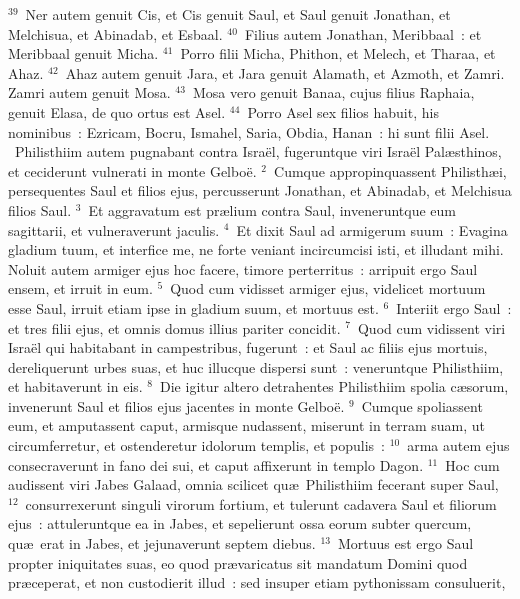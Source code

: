 ${}^{39}$~Ner autem genuit Cis, et Cis genuit Saul, et Saul genuit Jonathan, et Melchisua, et Abinadab, et Esbaal.
${}^{40}$~Filius autem Jonathan, Meribbaal~: et Meribbaal genuit Micha.
${}^{41}$~Porro filii Micha, Phithon, et Melech, et Tharaa, et Ahaz.
${}^{42}$~Ahaz autem genuit Jara, et Jara genuit Alamath, et Azmoth, et Zamri. Zamri autem genuit Mosa.
${}^{43}$~Mosa vero genuit Banaa, cujus filius Raphaia, genuit Elasa, de quo ortus est Asel.
${}^{44}$~Porro Asel sex filios habuit, his nominibus~: Ezricam, Bocru, Ismahel, Saria, Obdia, Hanan~: hi sunt filii Asel.
~\lettrine[lines=10,image=true,loversize=0.05,lraise=-0.03]{P}{}hilisthiim autem pugnabant contra Isra\"el, fugeruntque viri Isra\"el Pal\ae sthinos, et ceciderunt vulnerati in monte Gelbo\"e.
${}^{2}$~Cumque appropinquassent Philisth\ae i, persequentes Saul et filios ejus, percusserunt Jonathan, et Abinadab, et Melchisua filios Saul.
${}^{3}$~Et aggravatum est pr\ae lium contra Saul, inveneruntque eum sagittarii, et vulneraverunt jaculis.
${}^{4}$~Et dixit Saul ad armigerum suum~: Evagina gladium tuum, et interfice me, ne forte veniant incircumcisi isti, et illudant mihi. Noluit autem armiger ejus hoc facere, timore perterritus~: arripuit ergo Saul ensem, et irruit in eum.
${}^{5}$~Quod cum vidisset armiger ejus, videlicet mortuum esse Saul, irruit etiam ipse in gladium suum, et mortuus est.
${}^{6}$~Interiit ergo Saul~: et tres filii ejus, et omnis domus illius pariter concidit.
${}^{7}$~Quod cum vidissent viri Isra\"el qui habitabant in campestribus, fugerunt~: et Saul ac filiis ejus mortuis, dereliquerunt urbes suas, et huc illucque dispersi sunt~: veneruntque Philisthiim, et habitaverunt in eis.
${}^{8}$~Die igitur altero detrahentes Philisthiim spolia c\ae sorum, invenerunt Saul et filios ejus jacentes in monte Gelbo\"e.
${}^{9}$~Cumque spoliassent eum, et amputassent caput, armisque nudassent, miserunt in terram suam, ut circumferretur, et ostenderetur idolorum templis, et populis~:
${}^{10}$~arma autem ejus consecraverunt in fano dei sui, et caput affixerunt in templo Dagon.
${}^{11}$~Hoc cum audissent viri Jabes Galaad, omnia scilicet qu\ae\ Philisthiim fecerant super Saul,
${}^{12}$~consurrexerunt singuli virorum fortium, et tulerunt cadavera Saul et filiorum ejus~: attuleruntque ea in Jabes, et sepelierunt ossa eorum subter quercum, qu\ae\ erat in Jabes, et jejunaverunt septem diebus.
${}^{13}$~Mortuus est ergo Saul propter iniquitates suas, eo quod pr\ae varicatus sit mandatum Domini quod pr\ae ceperat, et non custodierit illud~: sed insuper etiam pythonissam consuluerit,
